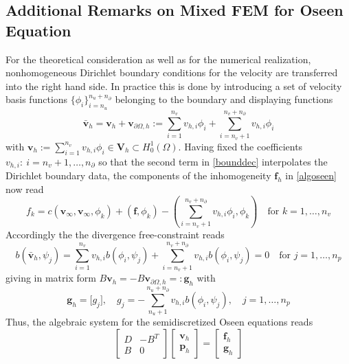 \documentclass[a4paper,10pt,BCOR=15mm]{scrbook}
\begin{document}
\subsection[Additional Remarks on Mixed FEM]{Additional Remarks on Mixed FEM for Oseen Equation}
For the theoretical consideration as well as for the numerical realization, nonhomogeneous Dirichlet boundary conditions for the velocity are transferred into the right hand side. In practice this is done by introducing a set of velocity basis functions $\{ \phi_i \}_{i=n_u}^{n_u+n_\partial}$ belonging to the boundary and displaying functions 
\begin{equation}\label{bounddec}
 \bar {\mathbf v}_h = \mathbf v_h + \mathbf v_{\partial \Omega,h} := \sum_{i=1}^{n_v}v_{h,i} \phi_i+\sum_{i=n_v+1}^{n_v+n_\partial} v_{h,i} \phi_i
\end{equation}
with $\mathbf v_h := \sum_{i=1}^{n_v}v_{h,i} \phi_i \in \mathbf V_h \subset H^1_0 (\Omega)$. Having fixed the coefficients $v_{h,i}:~i=n_v+1,\dotsc,n_\partial$ so that the second term in \ref{bounddec} interpolates the Dirichlet boundary data, the components of the inhomogeneity $\mathbf f_h$ in \eqref{algoseen} now read 
\begin{equation*}
  f_k = c(\mathbf v_\infty,\mathbf v_\infty, \phi_k)+(\mathbf f, \phi_k)- (\sum_{i=n_v+1}^{n_v+n_\partial} v_{h,i} \phi_i,\phi_k) \quad \text{for } k=1,\dots,n_v
\end{equation*}
Accordingly the the divergence free-constraint reads
\begin{equation*}
 b(\bar{\mathbf v}_h, \psi_j) =  \sum_{i=1}^{n_v}v_{h,i} b(\phi_i,\psi_j)+\sum_{i=n_v+1}^{n_v+n_\partial} v_{h,i} b(\phi_i,\psi_j) = 0 \quad \text{for  } j=1,\dotsc,n_p
\end{equation*}
giving in matrix form $B \mathbf v_h = -B \mathbf v_{\partial \Omega ,h} =: \mathbf g_h$ with  
\begin{equation*}
 \mathbf g_h = \bigl [ g_j \bigr ], \quad g_j = -\sum_{n_u+1}^{n_u+n_\partial} v_{h,i} b(\phi_i,\psi_j), \quad j=1,\dots,n_p
\end{equation*}
Thus, the algebraic system for the semidiscretized Oseen equations reads
\begin{equation}\label{algoseen2}
	 \begin{bmatrix} D& -B^T \\ B& 0 \end{bmatrix} \begin{bmatrix} \mathbf v_h \\\mathbf p_h  \end{bmatrix} = \begin{bmatrix} \mathbf f_h \\ \mathbf g_h \end{bmatrix} 
\end{equation}
\end{document}
